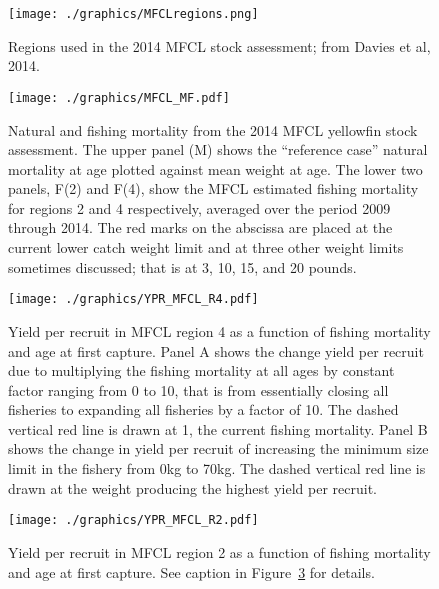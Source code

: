 \documentclass[12pt,letterpaper]{article}
\begin{document}
\begin{figure}
\begin{center}
\texttt{[image: ./graphics/MFCLregions.png]}
\caption{\label{fig:mfclreg}
Regions used in the 2014 MFCL stock assessment; from Davies et al,
2014.
}
\end{center}
\end{figure}

\begin{figure}
\begin{center}
\texttt{[image: ./graphics/MFCL\_MF.pdf]}
\caption{\label{fig:mfclmf}
Natural and fishing mortality from the 2014 MFCL yellowfin stock
assessment. The upper panel (M) shows the ``reference case'' natural
mortality at age plotted against mean weight at age.
The lower two panels, F(2) and F(4), show the MFCL estimated fishing
mortality for regions 2 and 4 respectively, averaged over the period
2009 through 2014.
The red marks on the abscissa are placed at
the current lower catch weight limit and at three other
weight limits sometimes discussed; 
that is at 3, 10, 15, and 20 pounds.
}
\end{center}
\end{figure}

\begin{figure}
\begin{center}
\texttt{[image: ./graphics/YPR\_MFCL\_R4.pdf]}
\caption{\label{fig:r4ypr}
Yield per recruit in MFCL region 4 as a function of fishing mortality
and age at first capture.
Panel A shows the change yield per recruit due to multiplying
the fishing mortality at all ages by constant factor ranging from 0 to
10, that is from essentially closing all fisheries to expanding all
fisheries by a factor of 10. 
The dashed vertical red line is drawn at 1, the current fishing mortality.
Panel B shows the change in yield per recruit of increasing
the minimum size limit in the fishery from 0kg to 70kg. 
The dashed vertical red line is drawn at the weight producing the
highest yield per recruit.
}
\end{center}
\end{figure}

\begin{figure}
\begin{center}
\texttt{[image: ./graphics/YPR\_MFCL\_R2.pdf]}
\caption{\label{fig:r2ypr}
Yield per recruit in MFCL region 2 as a function of fishing mortality
and age at first capture. 
See caption in Figure~\ref{fig:r4ypr} for details.
}
\end{center}
\end{figure}
\end{document}
